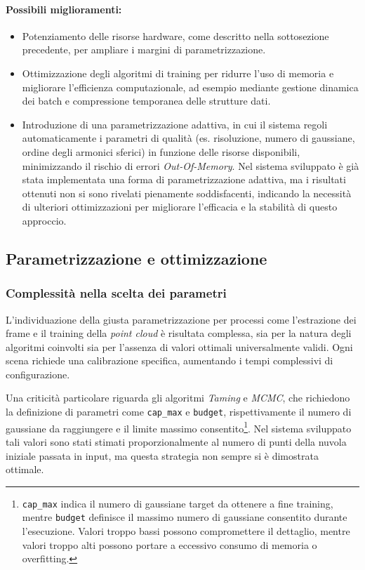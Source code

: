 \paragraph{Possibili miglioramenti:}
\begin{itemize}
	\item Potenziamento delle risorse hardware, come descritto nella sottosezione precedente, per ampliare i margini di parametrizzazione.
	\item Ottimizzazione degli algoritmi di training per ridurre l'uso di memoria e migliorare l'efficienza computazionale, ad esempio mediante gestione dinamica dei batch e compressione temporanea delle strutture dati.
	 \item Introduzione di una parametrizzazione adattiva, in cui il sistema regoli automaticamente i parametri di qualità (es. risoluzione, numero di gaussiane, ordine degli armonici sferici) in funzione delle risorse disponibili, minimizzando il rischio di errori \emph{Out-Of-Memory}.  
	Nel sistema sviluppato è già stata implementata una forma di parametrizzazione adattiva, ma i risultati ottenuti non si sono rivelati pienamente soddisfacenti, indicando la necessità di ulteriori ottimizzazioni per migliorare l'efficacia e la stabilità di questo approccio.
	
\end{itemize}


\subsection{Parametrizzazione e ottimizzazione}
\subsubsection{Complessità nella scelta dei parametri}
L'individuazione della giusta parametrizzazione per processi come l'estrazione dei frame e il training della \emph{point cloud} è risultata complessa, sia per la natura degli algoritmi coinvolti sia per l'assenza di valori ottimali universalmente validi.  
Ogni scena richiede una calibrazione specifica, aumentando i tempi complessivi di configurazione.  

Una criticità particolare riguarda gli algoritmi \emph{Taming} e \emph{MCMC}, che richiedono la definizione di parametri come \texttt{cap\_max} e \texttt{budget}, rispettivamente il numero di gaussiane da raggiungere e il limite massimo consentito\footnote{\texttt{cap\_max} indica il numero di gaussiane target da ottenere a fine training, mentre \texttt{budget} definisce il massimo numero di gaussiane consentito durante l'esecuzione. Valori troppo bassi possono compromettere il dettaglio, mentre valori troppo alti possono portare a eccessivo consumo di memoria o overfitting.}.  
Nel sistema sviluppato tali valori sono stati stimati proporzionalmente al numero di punti della nuvola iniziale passata in input, ma questa strategia non sempre si è dimostrata ottimale.  

